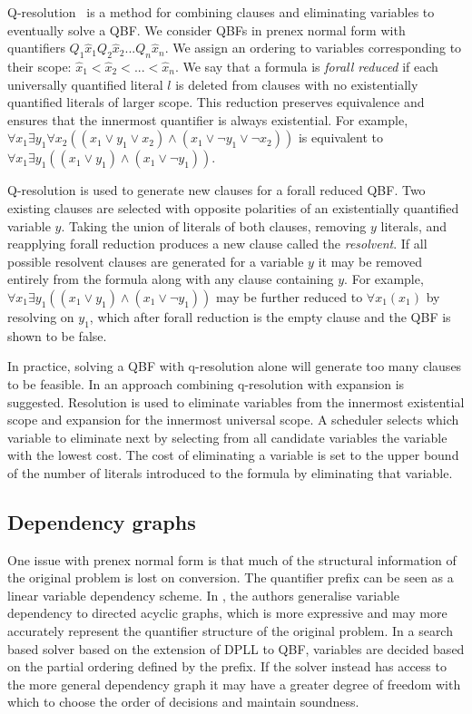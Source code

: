 Q-resolution~\cite{Buning95} is a method for combining clauses and eliminating variables to eventually solve a QBF. We consider QBFs in prenex normal form with quantifiers $Q_1 \hat{x}_1 Q_2 \hat{x}_2 ... Q_n \hat{x}_n$. We assign an ordering to variables corresponding to their scope: $\hat{x}_1 < \hat{x}_2 < ... < \hat{x}_n$. We say that a formula is \emph{forall reduced} if each universally quantified literal $l$ is deleted from clauses with no existentially quantified literals of larger scope. This reduction preserves equivalence and ensures that the innermost quantifier is always existential. For example, $\forall x_1 \exists y_1 \forall x_2  ((x_1 \lor y_1 \lor x_2) \land (x_1 \lor \lnot y_1 \lor \lnot x_2))$ is equivalent to $\forall x_1 \exists y_1 ((x_1 \lor y_1) \land (x_1 \lor \lnot y_1))$.

Q-resolution is used to generate new clauses for a forall reduced QBF. Two existing clauses are selected with opposite polarities of an existentially quantified variable $y$. Taking the union of literals of both clauses, removing $y$ literals, and reapplying forall reduction produces a new clause called the \emph{resolvent}. If all possible resolvent clauses are generated for a variable $y$ it may be removed entirely from the formula along with any clause containing $y$. For example, $\forall x_1 \exists y_1 ((x_1 \lor y_1) \land (x_1 \lor \lnot y_1))$ may be further reduced to $\forall x_1 (x_1)$ by resolving on $y_1$, which after forall reduction is the empty clause and the QBF is shown to be false. 

In practice, solving a QBF with q-resolution alone will generate too many clauses to be feasible. In \cite{Biere05} an approach combining q-resolution with expansion is suggested. Resolution is used to eliminate variables from the innermost existential scope and expansion for the innermost universal scope. A scheduler selects which variable to eliminate next by selecting from all candidate variables the variable with the lowest cost. The cost of eliminating a variable is set to the upper bound of the number of literals introduced to the formula by eliminating that variable.

\subsection{Dependency graphs}

One issue with prenex normal form is that much of the structural information of the original problem is lost on conversion. The quantifier prefix can be seen as a linear variable dependency scheme. In \cite{Lonsing10}, the authors generalise variable dependency to directed acyclic graphs, which is more expressive and may more accurately represent the quantifier structure of the original problem. In a search based solver based on the extension of DPLL to QBF, variables are decided based on the partial ordering defined by the prefix. If the solver instead has access to the more general dependency graph it may have a greater degree of freedom with which to choose the order of decisions and maintain soundness.

